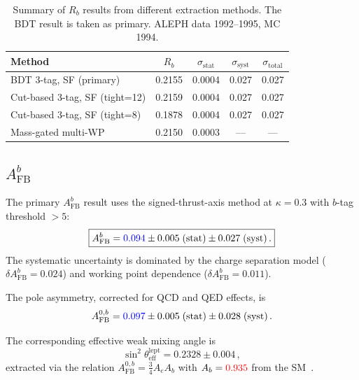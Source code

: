 \documentclass[11pt,a4paper]{article}
\newcommand{\measured}[1]{\textcolor{blue}{#1}}
\newcommand{\external}[1]{\textcolor{red}{#1}}
\begin{document}
\begin{table}[htbp]
\centering
\caption{Summary of $R_b$ results from different extraction methods.
  The BDT result is taken as primary.  ALEPH data 1992--1995, MC 1994.}
\label{tbl:rb-results}
\begin{tabular}{lcccc}
\toprule
Method & $R_b$ & $\sigma_\mathrm{stat}$ & $\sigma_\mathrm{syst}$ & $\sigma_\mathrm{total}$ \\
\midrule
BDT 3-tag, SF (primary) & 0.2155 & 0.0004 & 0.027 & 0.027 \\
Cut-based 3-tag, SF (tight=12) & 0.2159 & 0.0004 & 0.027 & 0.027 \\
Cut-based 3-tag, SF (tight=8) & 0.1878 & 0.0004 & 0.027 & 0.027 \\
Mass-gated multi-WP & 0.2150 & 0.0003 & --- & --- \\
\bottomrule
\end{tabular}
\end{table}

\subsection{$A_\mathrm{FB}^b$}

The primary $A_\mathrm{FB}^b$ result uses the signed-thrust-axis method
at $\kappa = 0.3$ with $b$-tag threshold $> 5$:
\begin{equation}
\boxed{
  A_\mathrm{FB}^b = \measured{0.094} \pm 0.005\;\mathrm{(stat)} \pm
  0.027\;\mathrm{(syst)}\,.
}
\label{eq:afb-result}
\end{equation}
The systematic uncertainty is dominated by the charge separation model
($\delta A_\mathrm{FB}^b = 0.024$) and working point dependence
($\delta A_\mathrm{FB}^b = 0.011$).

The pole asymmetry, corrected for QCD and QED effects, is
\begin{equation}
  A_\mathrm{FB}^{0,b} = \measured{0.097} \pm 0.005\;\mathrm{(stat)}
    \pm 0.028\;\mathrm{(syst)}\,.
  \label{eq:afb0-result}
\end{equation}

The corresponding effective weak mixing angle is
\begin{equation}
  \sin^2\theta_\mathrm{eff}^\mathrm{lept} = 0.2328 \pm 0.004\,,
  \label{eq:sin2theta}
\end{equation}
extracted via the relation $A_\mathrm{FB}^{0,b} = \frac{3}{4} A_e A_b$
with $A_b = \external{0.935}$ from the SM~\cite{LEP:EWWG:2005}.
\end{document}
